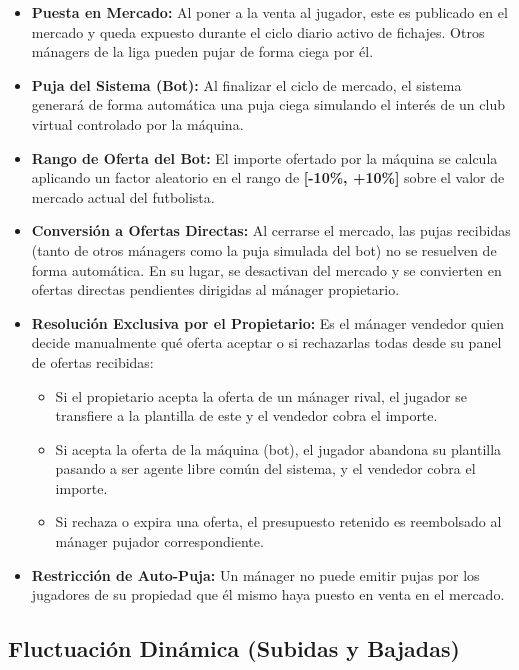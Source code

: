 \begin{itemize}
    \item \textbf{Puesta en Mercado:} Al poner a la venta al jugador, este es publicado en el mercado y queda expuesto durante el ciclo diario activo de fichajes. Otros mánagers de la liga pueden pujar de forma ciega por él.
    \item \textbf{Puja del Sistema (Bot):} Al finalizar el ciclo de mercado, el sistema generará de forma automática una puja ciega simulando el interés de un club virtual controlado por la máquina.
    \item \textbf{Rango de Oferta del Bot:} El importe ofertado por la máquina se calcula aplicando un factor aleatorio en el rango de \textbf{[-10\%, +10\%]} sobre el valor de mercado actual del futbolista.
    \item \textbf{Conversión a Ofertas Directas:} Al cerrarse el mercado, las pujas recibidas (tanto de otros mánagers como la puja simulada del bot) no se resuelven de forma automática. En su lugar, se desactivan del mercado y se convierten en ofertas directas pendientes dirigidas al mánager propietario.
    \item \textbf{Resolución Exclusiva por el Propietario:} Es el mánager vendedor quien decide manualmente qué oferta aceptar o si rechazarlas todas desde su panel de ofertas recibidas:
    \begin{itemize}
        \item Si el propietario acepta la oferta de un mánager rival, el jugador se transfiere a la plantilla de este y el vendedor cobra el importe.
        \item Si acepta la oferta de la máquina (bot), el jugador abandona su plantilla pasando a ser agente libre común del sistema, y el vendedor cobra el importe.
        \item Si rechaza o expira una oferta, el presupuesto retenido es reembolsado al mánager pujador correspondiente.
    \end{itemize}
    \item \textbf{Restricción de Auto-Puja:} Un mánager no puede emitir pujas por los jugadores de su propiedad que él mismo haya puesto en venta en el mercado.
\end{itemize}

\subsection{Fluctuación Dinámica (Subidas y Bajadas)}

